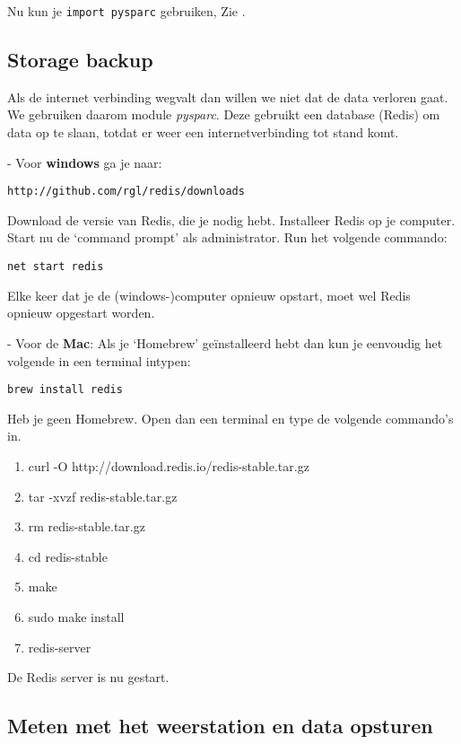 Nu kun je \verb|import pysparc| gebruiken, Zie  .

\subsection{Storage backup}
Als de internet verbinding wegvalt dan willen we niet dat de data verloren gaat.
We gebruiken daarom module \emph{pysparc}. Deze gebruikt een database (Redis) om data
op te slaan, totdat er weer een internetverbinding tot stand komt. 

- Voor \textbf{windows} ga je naar:
\begin{verbatim}
http://github.com/rgl/redis/downloads
\end{verbatim}

Download de versie van Redis, die je nodig hebt.
Installeer Redis op je computer. Start nu de `command prompt' als administrator.
Run het volgende commando: 

\begin{verbatim}
net start redis
\end{verbatim}

Elke keer dat je de (windows-)computer opnieuw opstart, moet wel Redis opnieuw opgestart worden.

- Voor de \textbf{Mac}:
Als je `Homebrew' geïnstalleerd hebt dan kun je eenvoudig het volgende 
in een terminal intypen: 
\begin{verbatim}
brew install redis
\end{verbatim}

Heb je geen Homebrew. Open dan een terminal en type de volgende commando's in. 

\begin{enumerate}
    \item curl -O http://download.redis.io/redis-stable.tar.gz
    \item tar -xvzf redis-stable.tar.gz 
    \item rm redis-stable.tar.gz 
    \item cd redis-stable 
    \item make 
    \item sudo make install
    \item redis-server
 \end{enumerate}
 
De Redis server is nu gestart. 

\subsection{Meten met het weerstation en data opsturen}

